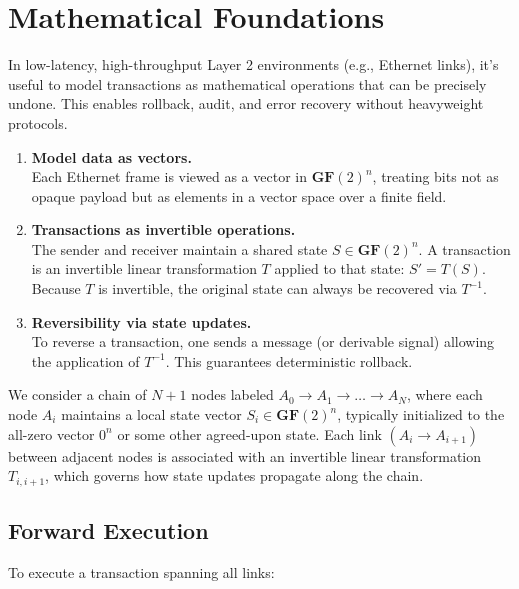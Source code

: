 \section{Mathematical Foundations}

In low-latency, high-throughput Layer 2 environments (e.g., Ethernet links), it's useful to model transactions as mathematical operations that can be precisely undone. This enables rollback, audit, and error recovery without heavyweight protocols.

\begin{enumerate}
\item \textbf{Model data as vectors.} \\
Each Ethernet frame is viewed as a vector in \(\mathbf{GF}(2)^n\), treating bits not as opaque payload but as elements in a vector space over a finite field.

\item \textbf{Transactions as invertible operations.} \\
The sender and receiver maintain a shared state \(S \in \mathbf{GF}(2)^n\). A transaction is an invertible linear transformation \(T\) applied to that state: \(S' = T(S)\). Because \(T\) is invertible, the original state can always be recovered via \(T^{-1}\).

\item \textbf{Reversibility via state updates.} \\
To reverse a transaction, one sends a message (or derivable signal) allowing the application of \(T^{-1}\). This guarantees deterministic rollback.
\end{enumerate}


We consider a chain of \(N+1\) nodes labeled \(A_0 \to A_1 \to \dots \to A_N\), where each node \(A_i\) maintains a local state vector \(S_i \in \mathbf{GF}(2)^n\), typically initialized to the all-zero vector \(0^n\) or some other agreed-upon state. Each link \((A_i \to A_{i+1})\) between adjacent nodes is associated with an invertible linear transformation \(T_{i,i+1}\), which governs how state updates propagate along the chain.


\subsection{Forward Execution}

To execute a transaction spanning all links:

